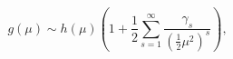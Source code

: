 \[g(\mu)\sim h(\mu)\left(1+\frac{1}{2}\sum_{s=1}^{\infty}\frac{\gamma_{s}}{(%
\frac{1}{2}\mu^{2})^{s}}\right),\]
